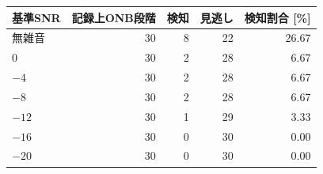 \begin{tabular}{lrrrr}
\toprule
基準SNR & 記録上ONB段階 & 検知 & 見逃し & 検知割合 [\%] \\
\midrule
無雑音 & 30 & 8 & 22 & 26.67 \\
$0$ & 30 & 2 & 28 & 6.67 \\
$-4$ & 30 & 2 & 28 & 6.67 \\
$-8$ & 30 & 2 & 28 & 6.67 \\
$-12$ & 30 & 1 & 29 & 3.33 \\
$-16$ & 30 & 0 & 30 & 0.00 \\
$-20$ & 30 & 0 & 30 & 0.00 \\
\bottomrule
\end{tabular}
